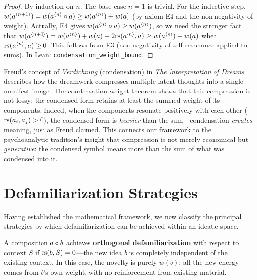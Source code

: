 \begin{proof}
By induction on $n$.  The base case $n = 1$ is trivial.  For the inductive step, $w(a^{\langle n+1 \rangle}) = w(a^{\langle n \rangle} \circ a) \geq w(a^{\langle n \rangle}) + w(a)$ (by axiom E4 and the non-negativity of weight).  Actually, E4 gives $w(a^{\langle n \rangle} \circ a) \geq w(a^{\langle n \rangle})$, so we need the stronger fact that $w(a^{\langle n+1 \rangle}) = w(a^{\langle n \rangle}) + w(a) + 2\mathrm{rs}(a^{\langle n \rangle}, a) \geq w(a^{\langle n \rangle}) + w(a)$ when $\mathrm{rs}(a^{\langle n \rangle}, a) \geq 0$.  This follows from E3 (non-negativity of self-resonance applied to sums).  In Lean: \texttt{condensation\_weight\_bound}.
\end{proof}

\begin{remark}
\label{rem:freud-condensation}
Freud's concept of \emph{Verdichtung} (condensation) in \textit{The Interpretation of Dreams} describes how the dreamwork compresses multiple latent thoughts into a single manifest image.  The condensation weight theorem shows that this compression is not lossy: the condensed form retains at least the summed weight of its components.  Indeed, when the components resonate positively with each other ($\mathrm{rs}(a_i, a_j) > 0$), the condensed form is \emph{heavier} than the sum---condensation \emph{creates} meaning, just as Freud claimed.  This connects our framework to the psychoanalytic tradition's insight that compression is not merely economical but \emph{generative}: the condensed symbol means more than the sum of what was condensed into it.
\end{remark}


\section{Defamiliarization Strategies}

Having established the mathematical framework, we now classify the principal
strategies by which defamiliarization can be achieved within an ideatic space.

\begin{definition}
\label{def:orthogonal-defam}
A composition $a \circ b$ achieves \textbf{orthogonal defamiliarization}
with respect to context $S$ if $\mathrm{rs}(b, S) = 0$---the new idea $b$ is
completely independent of the existing context.  In this case, the novelty is
purely $w(b)$: all the new energy comes from $b$'s own weight, with no
reinforcement from existing material.
\end{definition}

